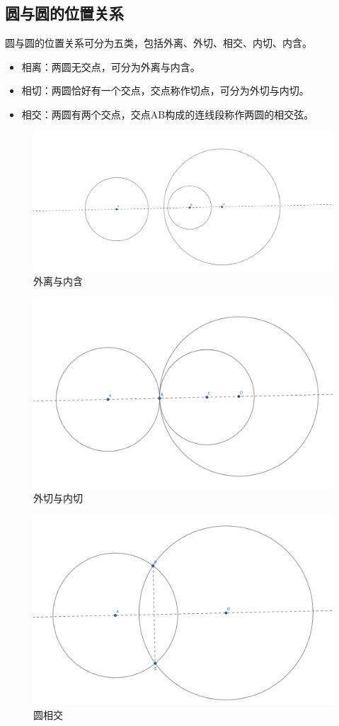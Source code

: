 \subsection{圆与圆的位置关系}
圆与圆的位置关系可分为五类，包括外离、外切、相交、内切、内含。
\begin{itemize}
    \item 相离：两圆无交点，可分为外离与内含。
    \item 相切：两圆恰好有一个交点，交点称作切点，可分为外切与内切。
    \item 相交：两圆有两个交点，交点AB构成的连线段称作两圆的相交弦。
\end{itemize}
\begin{figure}[H]
    \centering
    \includegraphics[width=0.5\linewidth]{figures/外离与内含.png}
    \caption{外离与内含}
\end{figure}
\begin{figure}[H]
    \centering
    \includegraphics[width=0.5\linewidth]{figures/外切与内切.png}
    \caption{外切与内切}
\end{figure}
\begin{figure}[H]
    \centering
    \includegraphics[width=0.5\linewidth]{figures/圆相交.png}
    \caption{圆相交}
\end{figure}


